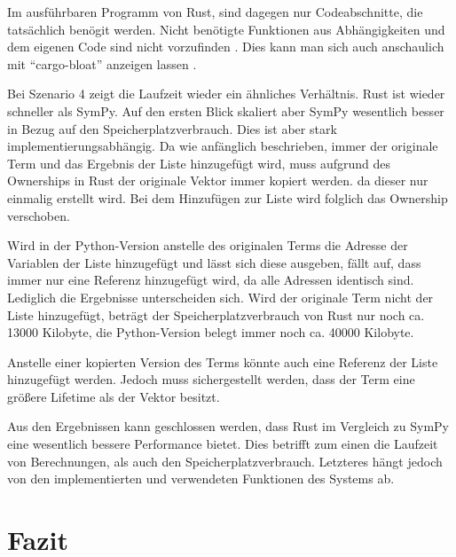 \documentclass[11pt,a4paper, ngerman]{article}
\begin{document}
Im ausführbaren Programm von Rust, sind dagegen nur Codeabschnitte, die tatsächlich benögit werden. Nicht benötigte Funktionen aus Abhängigkeiten und dem eigenen Code sind nicht vorzufinden \cite{RustDeadCode1}. Dies kann man sich auch anschaulich mit ``cargo-bloat'' anzeigen lassen \cite{RustDeadCode2}.

Bei Szenario 4 zeigt die Laufzeit wieder ein ähnliches Verhältnis. Rust ist wieder schneller als SymPy. Auf den ersten Blick skaliert aber SymPy wesentlich besser in Bezug auf den Speicherplatzverbrauch. Dies ist aber stark implementierungsabhängig. Da wie anfänglich beschrieben, immer der originale Term und das Ergebnis der Liste hinzugefügt wird, muss aufgrund des Ownerships in Rust der originale Vektor immer kopiert werden. da dieser nur einmalig erstellt wird. Bei dem Hinzufügen zur Liste wird folglich das Ownership verschoben.

Wird in der Python-Version anstelle des originalen Terms die Adresse der Variablen der Liste hinzugefügt und lässt sich diese ausgeben, fällt auf, dass immer nur eine Referenz hinzugefügt wird, da alle Adressen identisch sind. Lediglich die Ergebnisse unterscheiden sich. Wird der originale Term nicht der Liste hinzugefügt, beträgt der Speicherplatzverbrauch von Rust nur noch ca. 13000 Kilobyte, die Python-Version belegt immer noch ca. 40000 Kilobyte.

Anstelle einer kopierten Version des Terms könnte auch eine Referenz der Liste hinzugefügt werden. Jedoch muss sichergestellt werden, dass der Term eine größere Lifetime als der Vektor besitzt.

Aus den Ergebnissen kann geschlossen werden, dass Rust im Vergleich zu SymPy eine wesentlich bessere Performance bietet. Dies betrifft zum einen die Laufzeit von Berechnungen, als auch den Speicherplatzverbrauch. Letzteres hängt jedoch von den implementierten und verwendeten Funktionen des Systems ab.

\newpage

\section{Fazit}
\end{document}
